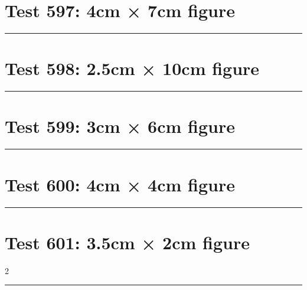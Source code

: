 \documentclass[a4paper,11pt]{article}
\begin{document}
\section*{Test 597: 4cm × 7cm figure}
\begin{swarmwrap}%
  \begin{minipage}[t]{4cm}
    \centering
    \rule{\linewidth}{7cm}
  \end{minipage}%
\end{swarmwrap}%
\swarmwrapnext
\lipsum[79]
\lipsum[80]
\lipsum[81]
\lipsum[82]
\section*{Test 598: 2.5cm × 10cm figure}
\begin{swarmwrap}%
  \begin{minipage}[t]{2cm}
    \centering
    \rule{\linewidth}{10cm}
  \end{minipage}%
\end{swarmwrap}%
\swarmwrapnext
\lipsum[107]
\lipsum[108]
\lipsum[109]
\lipsum[110]
\section*{Test 599: 3cm × 6cm figure}
\begin{swarmwrap}%
  \begin{minipage}[t]{3cm}
    \centering
    \rule{\linewidth}{6cm}
  \end{minipage}%
\end{swarmwrap}%
\swarmwrapnext
\lipsum[144]
\lipsum[145]
\lipsum[146]
\section*{Test 600: 4cm × 4cm figure}
\begin{swarmwrap}%
  \begin{minipage}[t]{4cm}
    \centering
    \rule{\linewidth}{4cm}
  \end{minipage}%
\end{swarmwrap}%
\swarmwrapnext
\lipsum[144]
\lipsum[145]
\lipsum[146]
\lipsum[147]
\lipsum[148]
\lipsum[149]
\section*{Test 601: 3.5cm × 2cm figure}
\begin{multicols}{2}
  \begin{swarmwrap}%
    \begin{minipage}[t]{3cm}
      \centering
      \rule{\linewidth}{2cm}
    \end{minipage}%
  \end{swarmwrap}%
  \swarmwrapnext
  \lipsum[99]
  \lipsum[100]
  \lipsum[101]
  \lipsum[102]
  \lipsum[103]
\end{multicols}
\end{document}
